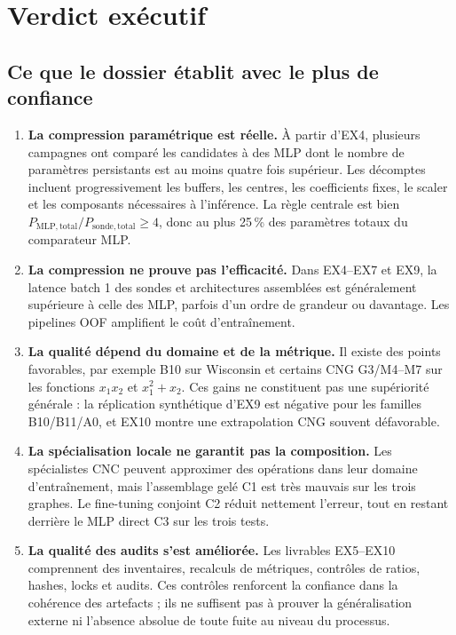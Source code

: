 \documentclass[11pt,a4paper]{article}
\newcommand{\important}[1]{\textbf{#1}}
\begin{document}
\tableofcontents
\newpage

\section{Verdict exécutif}

\subsection{Ce que le dossier établit avec le plus de confiance}

\begin{enumerate}
  \item \important{La compression paramétrique est réelle.} À partir d'EX4, plusieurs campagnes ont comparé les candidates à des MLP dont le nombre de paramètres persistants est au moins quatre fois supérieur. Les décomptes incluent progressivement les buffers, les centres, les coefficients fixes, le scaler et les composants nécessaires à l'inférence. La règle centrale est bien \(P_{\mathrm{MLP,total}}/P_{\mathrm{sonde,total}}\geq 4\), donc au plus 25\,\% des paramètres totaux du comparateur MLP.
  \item \important{La compression ne prouve pas l'efficacité.} Dans EX4--EX7 et EX9, la latence batch 1 des sondes et architectures assemblées est généralement supérieure à celle des MLP, parfois d'un ordre de grandeur ou davantage. Les pipelines OOF amplifient le coût d'entraînement.
  \item \important{La qualité dépend du domaine et de la métrique.} Il existe des points favorables, par exemple B10 sur Wisconsin et certains CNG G3/M4--M7 sur les fonctions \(x_1x_2\) et \(x_1^2+x_2\). Ces gains ne constituent pas une supériorité générale : la réplication synthétique d'EX9 est négative pour les familles B10/B11/A0, et EX10 montre une extrapolation CNG souvent défavorable.
  \item \important{La spécialisation locale ne garantit pas la composition.} Les spécialistes CNC peuvent approximer des opérations dans leur domaine d'entraînement, mais l'assemblage gelé C1 est très mauvais sur les trois graphes. Le fine-tuning conjoint C2 réduit nettement l'erreur, tout en restant derrière le MLP direct C3 sur les trois tests.
  \item \important{La qualité des audits s'est améliorée.} Les livrables EX5--EX10 comprennent des inventaires, recalculs de métriques, contrôles de ratios, hashes, locks et audits. Ces contrôles renforcent la confiance dans la cohérence des artefacts ; ils ne suffisent pas à prouver la généralisation externe ni l'absence absolue de toute fuite au niveau du processus.
\end{enumerate}
\end{document}
